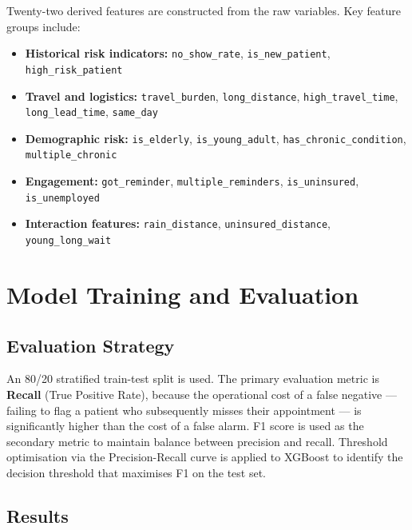 \documentclass[12pt, a4paper]{report}
\begin{document}
Twenty-two derived features are constructed from the raw variables. Key feature groups include:

\begin{itemize}
  \item \textbf{Historical risk indicators:} \texttt{no\_show\_rate}, \texttt{is\_new\_patient}, \texttt{high\_risk\_patient}
  \item \textbf{Travel and logistics:} \texttt{travel\_burden}, \texttt{long\_distance}, \texttt{high\_travel\_time}, \texttt{long\_lead\_time}, \texttt{same\_day}
  \item \textbf{Demographic risk:} \texttt{is\_elderly}, \texttt{is\_young\_adult}, \texttt{has\_chronic\_condition}, \texttt{multiple\_chronic}
  \item \textbf{Engagement:} \texttt{got\_reminder}, \texttt{multiple\_reminders}, \texttt{is\_uninsured}, \texttt{is\_unemployed}
  \item \textbf{Interaction features:} \texttt{rain\_distance}, \texttt{uninsured\_distance}, \texttt{young\_long\_wait}
\end{itemize}

\section{Model Training and Evaluation}

\subsection{Evaluation Strategy}

An 80/20 stratified train-test split is used. The primary evaluation metric is \textbf{Recall} (True Positive Rate), because the operational cost of a false negative --- failing to flag a patient who subsequently misses their appointment --- is significantly higher than the cost of a false alarm. F1 score is used as the secondary metric to maintain balance between precision and recall. Threshold optimisation via the Precision-Recall curve is applied to XGBoost to identify the decision threshold that maximises F1 on the test set.

\subsection{Results}
\end{document}
